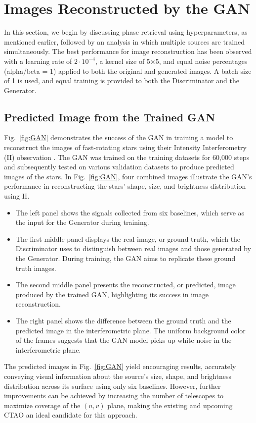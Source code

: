 \section{Images Reconstructed by the GAN}
In this section, we begin by discussing phase retrieval using hyperparameters, as mentioned earlier, followed by an analysis in which multiple sources are trained simultaneously. The best performance for image reconstruction has been observed with a learning rate of \(2 \cdot 10^{-4}\), a kernel size of 5×5, and equal noise percentages (alpha/beta = 1) applied to both the original and generated images. A batch size of 1 is used, and equal training is provided to both the Discriminator and the Generator.

\subsection{Predicted Image from the Trained GAN}
Fig.~\ref{fig:GAN} demonstrates the success of the GAN in training a model to reconstruct the images of  fast-rotating stars using their Intensity Interferometry (II) observation . The GAN was trained on the training datasets for 60,000 steps and subsequently tested on various validation datasets to produce predicted images of the stars. In Fig.~\ref{fig:GAN}, four combined images illustrate the GAN's performance in reconstructing the stars' shape, size, and brightness distribution using II.
\begin{itemize}
\item{The left panel shows the signals collected from six baselines, which serve as the input for the Generator during training.}
\item{The first middle panel displays the real image, or ground truth, which the Discriminator uses to distinguish between real images and those generated by the Generator. During training, the GAN aims to replicate these ground truth images.}
\item{The second middle panel presents the reconstructed, or predicted, image produced by the trained GAN, highlighting its success in image reconstruction.}
\item{The right panel shows the difference between the ground truth and the predicted image in the interferometric plane. The uniform background color of the frames suggests that the GAN model picks up white noise in the interferometric plane.}
\end{itemize}
The predicted images in Fig.~\ref{fig:GAN} yield encouraging results, accurately conveying visual information about the source's size, shape, and brightness distribution across its surface using only six baselines. However, further improvements can be achieved by increasing the number of telescopes to maximize coverage of the $(u, v)$ plane, making the existing and upcoming CTAO an ideal candidate for this approach.

